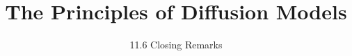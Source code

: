
\title{The Principles of Diffusion Models}
\subtitle{11.6 Closing Remarks}


\begin{frame}
    \titlepage
\end{frame}


